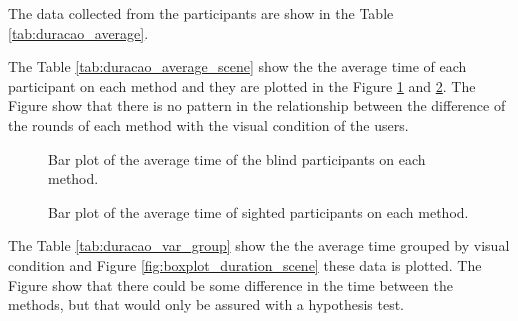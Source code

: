 
The data collected from the participants are show in the Table \ref{tab:duracao_average}.



The Table \ref{tab:duracao_average_scene} show the the average time of each participant on each method and they are plotted in the Figure \ref{fig:barplot_duration_scene_blind} and \ref{fig:barplot_duration_scene_sight}. The Figure show that there is no pattern in the relationship between the difference of the rounds of each method with the visual condition of the users. 



\begin{figure}[!htb]
    \centering
    \resizebox{0.6\linewidth}{!}{
    
    }
    \caption{Bar plot of the average time of the blind participants on each method.}
    \label{fig:barplot_duration_scene_blind}
\end{figure}
\begin{figure}[!htb]
    \centering
    \resizebox{0.6\linewidth}{!}{
    
    }
    \caption{Bar plot of the average time of sighted participants on each method.}
    \label{fig:barplot_duration_scene_sight}
\end{figure}

The Table \ref{tab:duracao_var_group} show the the average time grouped by visual condition and Figure \ref{fig:boxplot_duration_scene} these data is plotted. The Figure show that there could be some difference in the time between the methods, but that would only be assured with a hypothesis test. 

